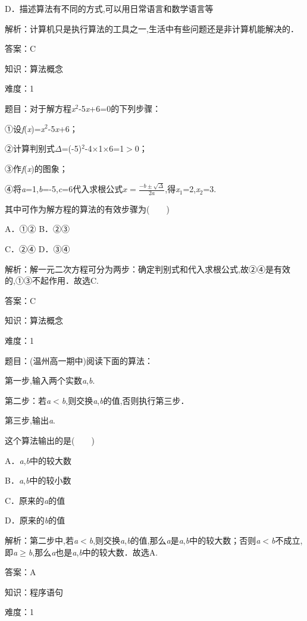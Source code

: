\documentclass{article} %
\begin{document}
D．描述算法有不同的方式,可以用日常语言和数学语言等

解析：计算机只是执行算法的工具之一,生活中有些问题还是非计算机能解决的．

答案：C

知识：算法概念

难度：1

题目：对于解方程\textit{x}${}^{2}$-5\textit{x}+6=0的下列步骤：

①设\textit{f}(\textit{x})=\textit{x}${}^{2}$-5\textit{x}+6；

②计算判别式\textit{$\mathit{\Delta}$}=(-5)${}^{2}$-4$\mathrm{\times}$1$\mathrm{\times}$6=1$\mathrm{>}$0；

③作\textit{f}(\textit{x})的图象；

④将\textit{a}=1,\textit{b}=-5,\textit{c}=6代入求根公式$x=\frac{-b\pm\sqrt{\Delta}}{2a}$,得\textit{x}${}_{1}$=2,\textit{x}${}_{2}$=3.

其中可作为解方程的算法的有效步骤为(　　)

A．①② B．②③

C．②④  D．③④

解析：解一元二次方程可分为两步：确定判别式和代入求根公式,故②④是有效的,①③不起作用．故选C.

答案：C

知识：算法概念

难度：1

题目：(温州高一期中)阅读下面的算法：

第一步,输入两个实数\textit{a},\textit{b}.

第二步：若\textit{a}$\mathrm{<}$\textit{b},则交换\textit{a},\textit{b}的值,否则执行第三步．

第三步,输出\textit{a}.

这个算法输出的是(　　)

A．\textit{a},\textit{b}中的较大数

B．\textit{a},\textit{b}中的较小数

C．原来的\textit{a}的值

D．原来的\textit{b}的值

解析：第二步中,若\textit{a}$\mathrm{<}$\textit{b},则交换\textit{a},\textit{b}的值,那么\textit{a}是\textit{a},\textit{b}中的较大数；否则\textit{a}$\mathrm{<}$\textit{b}不成立,即\textit{a}$\mathrm{\ge}$\textit{b},那么\textit{a}也是\textit{a},\textit{b}中的较大数．故选A.

答案：A


知识：程序语句

难度：1
\end{document}
